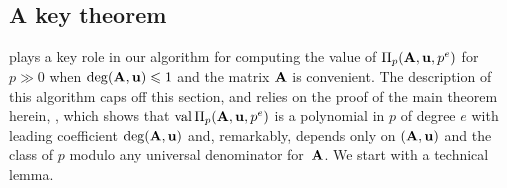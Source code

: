 \documentclass{article}
\begin{document}
\subsection{A key theorem}
 plays a key role in our algorithm for computing the value of $\Pi_p(\mathbf{A}, \mathbf{u}, p^e)$ for $p \gg 0$ when $\operatorname{deg}(\mathbf{A},\mathbf{u}) \leqslant 1$ and the matrix $\mathbf{A}$ is convenient.
The description of this algorithm caps off this section, and relies on the proof of the main theorem herein, , which shows that $\operatorname{val} \Pi_p(\mathbf{A}, \mathbf{u}, p^e)$ is a polynomial in $p$ of degree $e$ with leading coefficient $\operatorname{deg}(\mathbf{A},\mathbf{u})$ and, remarkably, depends only on $(\mathbf{A},\mathbf{u})$ and the class of $p$ modulo any universal denominator for~$\mathbf{A}$.
We start with a technical lemma.


   
\end{document}
